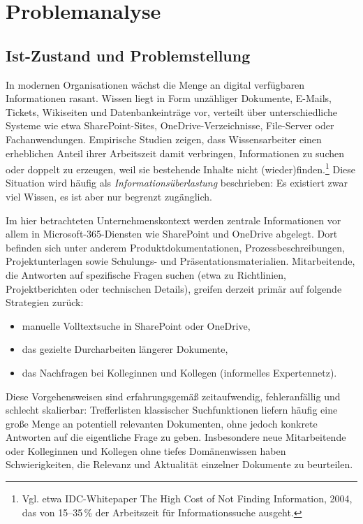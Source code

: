 \pagebreak
\section{Problemanalyse}\label{sec:problemanalyse}

\subsection{Ist-Zustand und Problemstellung}\label{subsec:ist-zustand-und-problemstellung}

In modernen Organisationen wächst die Menge an digital verfügbaren Informationen rasant.
Wissen liegt in Form unzähliger Dokumente, E-Mails, Tickets, Wikiseiten und Datenbankeinträge vor, verteilt über unterschiedliche Systeme wie etwa SharePoint-Sites, OneDrive-Verzeichnisse, File-Server oder Fachanwendungen.
Empirische Studien zeigen, dass Wissensarbeiter einen erheblichen Anteil ihrer Arbeitszeit damit verbringen, Informationen zu suchen oder doppelt zu erzeugen, weil sie bestehende Inhalte nicht (wieder)finden.\footnote{Vgl. etwa IDC-Whitepaper \glqq The High Cost of Not Finding Information\grqq{}, 2004, das von 15--35\,\% der Arbeitszeit für Informationssuche ausgeht.}
Diese Situation wird häufig als \textit{Informationsüberlastung} beschrieben: Es existiert zwar viel Wissen, es ist aber nur begrenzt zugänglich.

Im hier betrachteten Unternehmenskontext werden zentrale Informationen vor allem in Microsoft-365-Diensten wie SharePoint und OneDrive abgelegt.
Dort befinden sich unter anderem Produktdokumentationen, Prozessbeschreibungen, Projektunterlagen sowie Schulungs- und Präsentationsmaterialien.
Mitarbeitende, die Antworten auf spezifische Fragen suchen (etwa zu Richtlinien, Projektberichten oder technischen Details), greifen derzeit primär auf folgende Strategien zurück:

\begin{itemize}
    \item manuelle Volltextsuche in SharePoint oder OneDrive,
    \item das gezielte Durcharbeiten längerer Dokumente,
    \item das Nachfragen bei Kolleginnen und Kollegen (\glqq informelles Expertennetz\grqq{}).
\end{itemize}

Diese Vorgehensweisen sind erfahrungsgemäß zeitaufwendig, fehleranfällig und schlecht skalierbar:
Trefferlisten klassischer Suchfunktionen liefern häufig eine große Menge an potentiell relevanten Dokumenten, ohne jedoch konkrete Antworten auf die eigentliche Frage zu geben.
Insbesondere neue Mitarbeitende oder Kolleginnen und Kollegen ohne tiefes Domänenwissen haben Schwierigkeiten, die Relevanz und Aktualität einzelner Dokumente zu beurteilen.

